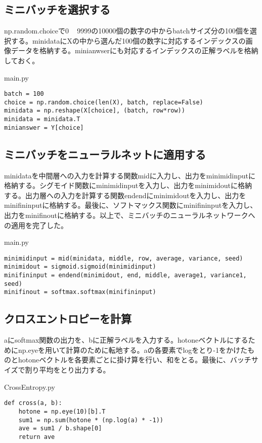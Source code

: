 \documentclass{ujarticle}
\begin{document}
\subsection{ミニバッチを選択する}
np.random.choiceで0 ~ 9999の10000個の数字の中からbatchサイズ分の100個を選択する。minidataにXの中から選んだ100個の数字に対応するインデックスの画像データを格納する。minianwserにも対応するインデックスの正解ラベルを格納しておく。

main.py
\begin{lstlisting}[basicstyle=\ttfamily\footnotesize, frame=single]
batch = 100
choice = np.random.choice(len(X), batch, replace=False)
minidata = np.reshape(X[choice], (batch, row*row))
minidata = minidata.T
minianswer = Y[choice]
\end{lstlisting}


\subsection{ミニバッチをニューラルネットに適用する}
minidataを中間層への入力を計算する関数midに入力し、出力をminimidinputに格納する。シグモイド関数にminimidinputを入力し、出力をminimidoutに格納する。出力層への入力を計算する関数endendにminimidoutを入力し、出力をminifininputに格納する。最後に、ソフトマックス関数にminifininputを入力し、出力をminifinoutに格納する。以上で、ミニバッチのニューラルネットワークへの適用を完了した。

main.py
\begin{lstlisting}[basicstyle=\ttfamily\footnotesize, frame=single]
minimidinput = mid(minidata, middle, row, average, variance, seed)
minimidout = sigmoid.sigmoid(minimidinput)
minifininput = endend(minimidout, end, middle, average1, variance1, seed)
minifinout = softmax.softmax(minifininput)
\end{lstlisting}

\subsection{クロスエントロピーを計算}
aにsoftmax関数の出力を、bに正解ラベルを入力する。hotoneベクトルにするためにnp.eyeを用いて計算のために転地する。aの各要素でlogをとり-1をかけたものとhotoneベクトルを各要素ごとに掛け算を行い、和をとる。最後に、バッチサイズで割り平均をとり出力する。

CrossEntropy.py
\begin{lstlisting}[basicstyle=\ttfamily\footnotesize, frame=single]
def cross(a, b):
    hotone = np.eye(10)[b].T
    sum1 = np.sum(hotone * (np.log(a) * -1))
    ave = sum1 / b.shape[0]
    return ave
\end{lstlisting}
\end{document}
